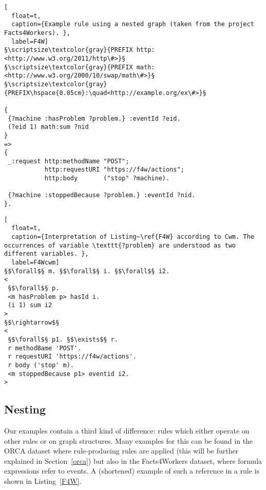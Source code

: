 \begin{lstlisting}[
  float=t,
  caption={Example rule using a nested graph (taken from the project Facts4Workers). },
  label=F4W]
§\scriptsize\textcolor{gray}{PREFIX http: <http://www.w3.org/2011/http\#>}§
§\scriptsize\textcolor{gray}{PREFIX math: <http://www.w3.org/2000/10/swap/math\#>}§
§\scriptsize\textcolor{gray}{PREFIX\hspace{0.85cm}:\quad<http://example.org/ex\#>}§
 
{  
 {?machine :hasProblem ?problem.} :eventId ?eid.
 (?eid 1) math:sum ?nid
}
=>
{
 _:request http:methodName "POST";
           http:requestURI "https://f4w/actions";
           http:body       ("stop" ?machine).
      
 {?machine :stoppedBecause ?problem.} :eventId ?nid.
}. 
\end{lstlisting}
\begin{lstlisting}[
  float=t,
  caption={Interpretation of Listing~\ref{F4W} according to Cwm. The occurrences of variable \texttt{?problem} are understood as two different variables. },
  label=F4Wcwm]
§$\forall$§ m. §$\forall$§ i. §$\forall$§ i2.
<
 §$\forall$§ p.
 <m hasProblem p> hasId i.
 (i 1) sum i2 
> 
§$\rightarrow$§
<
 §$\forall$§ p1. §$\exists$§ r. 
 r methodBame 'POST'. 
 r requestURI 'https://f4w/actions'.
 r body ('stop' m).
 <m stoppedBecause p1> eventid i2. 
>
\end{lstlisting}
\subsection{Nesting}\label{nest}

Our examples contain a third kind of difference:
rules which either operate on other rules or on graph structures. Many examples for this can be found in the 
ORCA dataset where rule-producing rules are applied (this will be further explained in Section~\ref{orca}) but also  in the Facts4Workers dataset, where formula expressions 
refer to events.
A (shortened) example of such a reference in a rule is shown in Listing~\ref{F4W}. 

